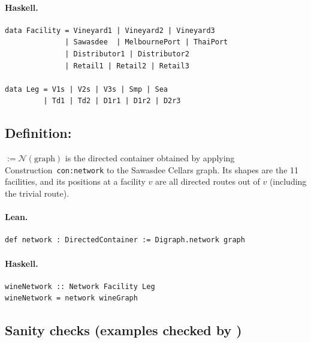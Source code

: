 \documentclass[11pt,a4paper]{article}
\begin{document}
\paragraph{Haskell.}
\begin{lstlisting}[style=haskell]
data Facility = Vineyard1 | Vineyard2 | Vineyard3
              | Sawasdee  | MelbournePort | ThaiPort
              | Distributor1 | Distributor2
              | Retail1 | Retail2 | Retail3

data Leg = V1s | V2s | V3s | Smp | Sea
         | Td1 | Td2 | D1r1 | D1r2 | D2r3
\end{lstlisting}


\subsection{Definition: }

\begin{defn}
 $:= \mathcal{N}(\text{graph})$ is the directed container
obtained by applying Construction~\texttt{con:network} to the Sawasdee Cellars
graph.  Its shapes are the 11 facilities, and its positions at a facility $v$
are all directed routes out of $v$ (including the trivial route).
\end{defn}

\paragraph{Lean.}
\begin{lstlisting}[style=lean]
def network : DirectedContainer := Digraph.network graph
\end{lstlisting}

\paragraph{Haskell.}
\begin{lstlisting}[style=haskell]
wineNetwork :: Network Facility Leg
wineNetwork = network wineGraph
\end{lstlisting}


\subsection{Sanity checks (examples checked by )}
\end{document}
